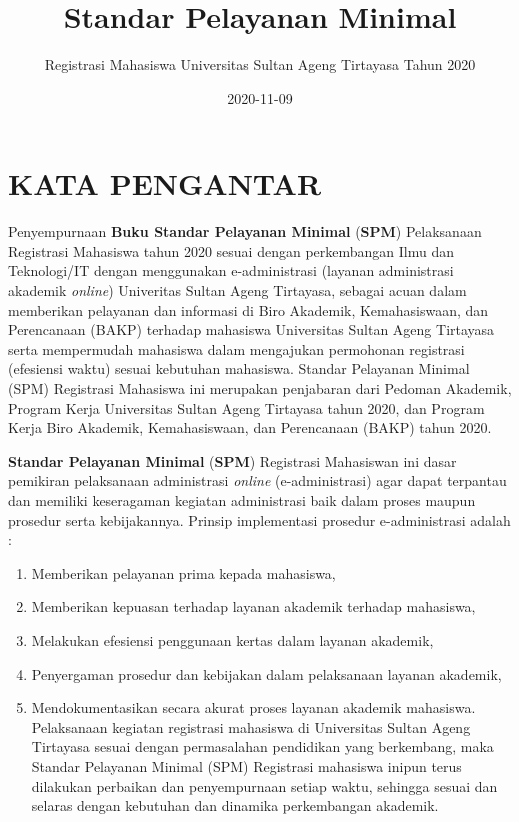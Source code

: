 \documentclass[
]{book}
\title{Standar Pelayanan Minimal}
\author{Registrasi Mahasiswa Universitas Sultan Ageng Tirtayasa Tahun 2020}
\date{2020-11-09}
\providecommand{\tightlist}{%
  \setlength{\itemsep}{0pt}\setlength{\parskip}{0pt}}
\begin{document}
\maketitle

{
\setcounter{tocdepth}{1}
\tableofcontents
}
\hypertarget{kata-pengantar}{%
\chapter*{KATA PENGANTAR}\label{kata-pengantar}}

Penyempurnaan \textbf{Buku Standar Pelayanan Minimal} (\textbf{SPM}) Pelaksanaan Registrasi Mahasiswa tahun 2020 sesuai dengan perkembangan Ilmu dan Teknologi/IT dengan menggunakan e-administrasi (layanan administrasi akademik \emph{online}) Univeritas Sultan Ageng Tirtayasa, sebagai acuan dalam memberikan pelayanan dan informasi di Biro Akademik, Kemahasiswaan, dan Perencanaan (BAKP) terhadap mahasiswa Universitas Sultan Ageng Tirtayasa serta mempermudah mahasiswa dalam mengajukan permohonan registrasi (efesiensi waktu) sesuai kebutuhan mahasiswa.
Standar Pelayanan Minimal (SPM) Registrasi Mahasiswa ini merupakan penjabaran dari Pedoman Akademik, Program Kerja Universitas Sultan Ageng Tirtayasa tahun 2020, dan Program Kerja Biro Akademik, Kemahasiswaan, dan Perencanaan (BAKP) tahun 2020.

\textbf{Standar Pelayanan Minimal} (\textbf{SPM}) Registrasi Mahasiswan ini dasar pemikiran pelaksanaan administrasi \emph{online} (e-administrasi) agar dapat terpantau dan memiliki keseragaman kegiatan administrasi baik dalam proses maupun prosedur serta kebijakannya. Prinsip implementasi prosedur e-administrasi adalah :

\begin{enumerate}
\def\labelenumi{\arabic{enumi}.}
\tightlist
\item
  Memberikan pelayanan prima kepada mahasiswa,
\item
  Memberikan kepuasan terhadap layanan akademik terhadap mahasiswa,
\item
  Melakukan efesiensi penggunaan kertas dalam layanan akademik,
\item
  Penyergaman prosedur dan kebijakan dalam pelaksanaan layanan akademik,
\item
  Mendokumentasikan secara akurat proses layanan akademik mahasiswa. Pelaksanaan kegiatan registrasi mahasiswa di Universitas Sultan Ageng Tirtayasa sesuai dengan permasalahan pendidikan yang berkembang, maka Standar Pelayanan Minimal (SPM) Registrasi mahasiswa inipun terus dilakukan perbaikan dan penyempurnaan setiap waktu, sehingga sesuai dan selaras dengan kebutuhan dan dinamika perkembangan akademik.
\end{enumerate}
\end{document}
